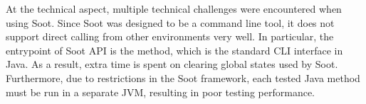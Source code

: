 At the technical aspect,
multiple technical challenges were encountered when using Soot.
Since Soot was designed to be a command line tool,
it does not support direct calling from other environments very well.
In particular, the entrypoint of Soot API is the  method,
which is the standard CLI interface in Java.
As a result, extra time is spent on clearing global states used by Soot.
Furthermore, due to restrictions in the Soot framework,
each tested Java method must be run in a separate JVM,
resulting in poor testing performance.
